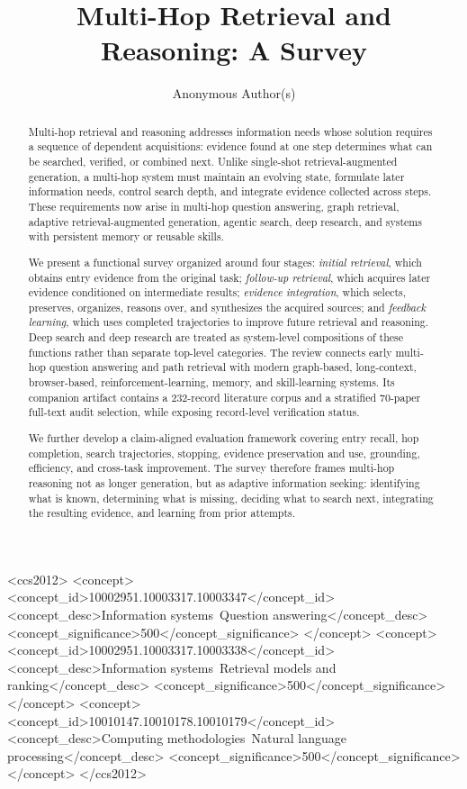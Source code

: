\documentclass[acmsmall,review,anonymous]{acmart}
\newcommand{\CorpusSize}{232}
\newcommand{\AuditSize}{70}
\begin{document}
\title{Multi-Hop Retrieval and Reasoning: A Survey}

\author{Anonymous Author(s)}

\begin{abstract}
Multi-hop retrieval and reasoning addresses information needs whose solution requires a sequence of dependent acquisitions: evidence found at one step determines what can be searched, verified, or combined next. Unlike single-shot retrieval-augmented generation, a multi-hop system must maintain an evolving state, formulate later information needs, control search depth, and integrate evidence collected across steps. These requirements now arise in multi-hop question answering, graph retrieval, adaptive retrieval-augmented generation, agentic search, deep research, and systems with persistent memory or reusable skills.

We present a functional survey organized around four stages: \emph{initial retrieval}, which obtains entry evidence from the original task; \emph{follow-up retrieval}, which acquires later evidence conditioned on intermediate results; \emph{evidence integration}, which selects, preserves, organizes, reasons over, and synthesizes the acquired sources; and \emph{feedback learning}, which uses completed trajectories to improve future retrieval and reasoning. Deep search and deep research are treated as system-level compositions of these functions rather than separate top-level categories. The review connects early multi-hop question answering and path retrieval with modern graph-based, long-context, browser-based, reinforcement-learning, memory, and skill-learning systems. Its companion artifact contains a \CorpusSize-record literature corpus and a stratified \AuditSize-paper full-text audit selection, while exposing record-level verification status.

We further develop a claim-aligned evaluation framework covering entry recall, hop completion, search trajectories, stopping, evidence preservation and use, grounding, efficiency, and cross-task improvement. The survey therefore frames multi-hop reasoning not as longer generation, but as adaptive information seeking: identifying what is known, determining what is missing, deciding what to search next, integrating the resulting evidence, and learning from prior attempts.
\end{abstract}

\begin{CCSXML}
<ccs2012>
<concept>
<concept_id>10002951.10003317.10003347</concept_id>
<concept_desc>Information systems~Question answering</concept_desc>
<concept_significance>500</concept_significance>
</concept>
<concept>
<concept_id>10002951.10003317.10003338</concept_id>
<concept_desc>Information systems~Retrieval models and ranking</concept_desc>
<concept_significance>500</concept_significance>
</concept>
<concept>
<concept_id>10010147.10010178.10010179</concept_id>
<concept_desc>Computing methodologies~Natural language processing</concept_desc>
<concept_significance>500</concept_significance>
</concept>
</ccs2012>
\end{CCSXML}
\end{document}
